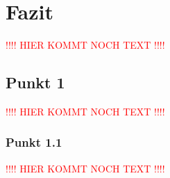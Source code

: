 \chapter{Fazit}
\label{sec:Fazit}

\textcolor{red}{!!!! HIER KOMMT NOCH TEXT !!!!}

\section{Punkt 1}

\textcolor{red}{!!!! HIER KOMMT NOCH TEXT !!!!}

\subsection{Punkt 1.1}

\textcolor{red}{!!!! HIER KOMMT NOCH TEXT !!!!}